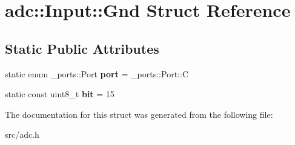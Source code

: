 \hypertarget{structadc_1_1Input_1_1Gnd}{}\section{adc\+:\+:Input\+:\+:Gnd Struct Reference}
\label{structadc_1_1Input_1_1Gnd}
\subsection*{Static Public Attributes}
\begin{DoxyCompactItemize}
\item 
static enum \+\_\+ports\+::\+Port {\bfseries port} = \+\_\+ports\+::\+Port\+::C\hypertarget{structadc_1_1Input_1_1Gnd_a239ef33725db4fdb0e7820a9bb0c65f3}{}\label{structadc_1_1Input_1_1Gnd_a239ef33725db4fdb0e7820a9bb0c65f3}

\item 
static const uint8\+\_\+t {\bfseries bit} = 15\hypertarget{structadc_1_1Input_1_1Gnd_ac4396959d7953db075098bb106a39deb}{}\label{structadc_1_1Input_1_1Gnd_ac4396959d7953db075098bb106a39deb}

\end{DoxyCompactItemize}


The documentation for this struct was generated from the following file\+:\begin{DoxyCompactItemize}
\item 
src/adc.\+h\end{DoxyCompactItemize}
